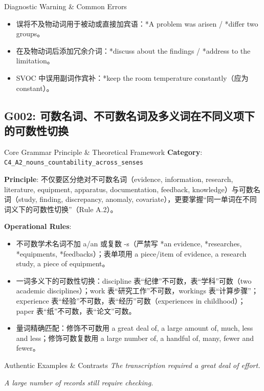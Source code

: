 \begin{TipBox}{Diagnostic Warning \& Common Errors}
\begin{itemize}[leftmargin=1.5em, itemsep=1pt]
  \item 误将不及物动词用于被动或直接加宾语：*A problem was arisen / *differ two groups。
  \item 在及物动词后添加冗余介词：*discuss about the findings / *address to the limitation。
  \item SVOC 中误用副词作宾补：*keep the room temperature constantly（应为 constant）。
\end{itemize}
\end{TipBox}
\vspace{6pt}
\subsection{G002: 可数名词、不可数名词及多义词在不同义项下的可数性切换}\label{sec:rule:G002}
\begin{ConceptBox}{Core Grammar Principle \& Theoretical Framework}
\textbf{Category}: \texttt{C4\_A2\_nouns\_countability\_across\_senses}\par\vspace{3pt}
\textbf{Principle}: 不仅要区分绝对不可数名词（evidence, information, research, literature, equipment, apparatus, documentation, feedback, knowledge）与可数名词（study, finding, discrepancy, anomaly, covariate），更要掌握“同一单词在不同词义下的可数性切换”（Rule A.2）。\par\vspace{4pt}
\textbf{Operational Rules}:
\begin{itemize}[leftmargin=1.5em, itemsep=1pt]
  \item 不可数学术名词不加 a/an 或复数 -s（严禁写 *an evidence, *researches, *equipments, *feedbacks）；表单项用 a piece/item of evidence, a research study, a piece of equipment。
  \item 一词多义下的可数性切换：discipline 表“纪律”不可数，表“学科”可数（two academic disciplines）；work 表“研究工作”不可数，workings 表“计算步骤”；experience 表“经验”不可数，表“经历”可数（experiences in childhood）；paper 表“纸”不可数，表“论文”可数。
  \item 量词精确匹配：修饰不可数用 a great deal of, a large amount of, much, less and less；修饰可数复数用 a large number of, a handful of, many, fewer and fewer。
\end{itemize}
\end{ConceptBox}
\begin{ExampleBox}{Authentic Examples \& Contrasts}
\textit{The transcription required a great deal of effort.}\par\vspace{2pt}
\textit{A large number of records still require checking.}\par\vspace{2pt}
\end{ExampleBox}
